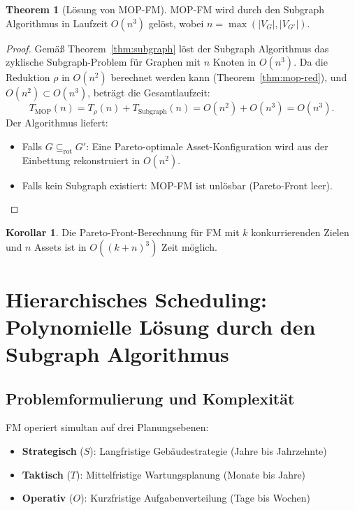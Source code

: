 ﻿\documentclass[a4paper,12pt]{article}
\theoremstyle{definition}
\newtheorem{korollar}{Korollar}[section]
\newtheorem{theorem}{Theorem}[section]
\begin{document}
\begin{theorem}[Lösung von MOP-FM]
\label{thm:mop-sol}
MOP-FM wird durch den Subgraph Algorithmus in Laufzeit $O(n^3)$ gelöst,
wobei $n = \max(|V_G|, |V_{G'}|)$.
\end{theorem}

\begin{proof}
Gemäß Theorem~\ref{thm:subgraph} löst der Subgraph Algorithmus das zyklische
Subgraph-Problem für Graphen mit $n$ Knoten in $O(n^3)$.
Da die Reduktion $\rho$ in $O(n^2)$ berechnet werden kann
(Theorem~\ref{thm:mop-red}), und $O(n^2) \subset O(n^3)$, beträgt die
Gesamtlaufzeit:
\[
    T_{\mathrm{MOP}}(n) = T_\rho(n) + T_{\mathrm{Subgraph}}(n) = O(n^2) + O(n^3) = O(n^3).
\]
Der Algorithmus liefert:
\begin{itemize}
    \item Falls $G \subseteq_{\mathrm{rot}} G'$: Eine Pareto-optimale Asset-Konfiguration
          wird aus der Einbettung rekonstruiert in $O(n^2)$.
    \item Falls kein Subgraph existiert: MOP-FM ist unlösbar (Pareto-Front leer).
\end{itemize}
\end{proof}

\begin{korollar}
\label{kor:mop}
Die Pareto-Front-Berechnung für FM mit $k$ konkurrierenden Zielen und $n$ Assets
ist in $O((k+n)^3)$ Zeit möglich.
\end{korollar}

\section{Hierarchisches Scheduling: Polynomielle Lösung durch den Subgraph Algorithmus}
\label{sec:scheduling}

\subsection{Problemformulierung und Komplexität}

FM operiert simultan auf drei Planungsebenen:
\begin{itemize}
    \item \textbf{Strategisch} ($S$): Langfristige Gebäudestrategie (Jahre bis Jahrzehnte)
    \item \textbf{Taktisch} ($T$): Mittelfristige Wartungsplanung (Monate bis Jahre)
    \item \textbf{Operativ} ($O$): Kurzfristige Aufgabenverteilung (Tage bis Wochen)
\end{itemize}
\end{document}
